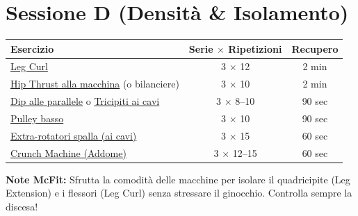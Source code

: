\documentclass[11pt,a4paper]{article}
\begin{document}
\section*{Sessione D (Densità \& Isolamento)}
\begin{tabular}{>{\raggedright\arraybackslash}p{6.5cm} c c}
\toprule
\textbf{Esercizio} & \textbf{Serie $\times$ Ripetizioni} & \textbf{Recupero} \\
\midrule
\href{https://www.youtube.com/results?search_query=leg+curl+tutorial+short}{Leg Curl} & 3 $\times$ 12 & 2 min \\
\href{https://www.youtube.com/results?search_query=machine+hip+thrust+tutorial+short}{Hip Thrust alla macchina} (o bilanciere) & 3 $\times$ 10 & 2 min \\
\href{https://www.youtube.com/results?search_query=tricep+dips+tutorial+short}{Dip alle parallele} o \href{https://www.youtube.com/results?search_query=cable+tricep+pushdown+tutorial+short}{Tricipiti ai cavi} & 3 $\times$ 8--10 & 90 sec \\
\href{https://www.youtube.com/results?search_query=seated+cable+row+tutorial+short}{Pulley basso} & 3 $\times$ 10 & 90 sec \\
\href{https://www.youtube.com/results?search_query=rotator+cuff+exercises+tutorial+short}{Extra-rotatori spalla (ai cavi)} & 3 $\times$ 15 & 60 sec \\
\href{https://www.youtube.com/results?search_query=crunch+machine+abs+tutorial+short}{Crunch Machine (Addome)} & 3 $\times$ 12--15 & 60 sec \\
\bottomrule
\end{tabular}

\vspace{0.4cm}
\noindent\textbf{Note McFit:} Sfrutta la comodità delle macchine per isolare il quadricipite (Leg Extension) e i flessori (Leg Curl) senza stressare il ginocchio. Controlla sempre la discesa!
\end{document}
